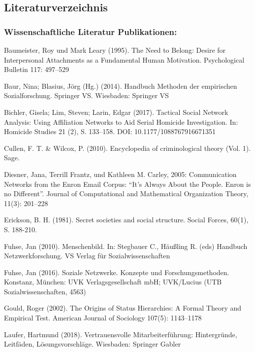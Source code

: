 \documentclass[
]{article}
\begin{document}
\hypertarget{literaturverzeichnis}{%
\subsection{Literaturverzeichnis}\label{literaturverzeichnis}}

\hypertarget{wissenschaftliche-literatur-publikationen}{%
\subsubsection{Wissenschaftliche Literatur \textbar{}
Publikationen:}\label{wissenschaftliche-literatur-publikationen}}

Baumeister, Roy und Mark Leary (1995). The Need to Belong: Desire for
Interpersonal Attachments as a Fundamental Human Motivation.
Psychological Bulletin 117: 497--529

Baur, Nina; Blasius, Jörg (Hg.) (2014). Handbuch Methoden der
empirischen Sozialforschung. Springer VS. Wiesbaden: Springer VS

Bichler, Gisela; Lim, Steven; Larin, Edgar (2017). Tactical Social
Network Analysis: Using Affiliation Networks to Aid Serial Homicide
Investigation. In: Homicide Studies 21 (2), S. 133--158. DOI:
10.1177/1088767916671351

Cullen, F. T. \& Wilcox, P. (2010). Encyclopedia of criminological
theory (Vol. 1). Sage.

Diesner, Jana, Terrill Frantz, und Kathleen M. Carley, 2005:
Communication Networks from the Enron Email Corpus: ``It's Always About
the People. Enron is no Different''. Journal of Computational and
Mathematical Organization Theory, 11(3): 201--228

Erickson, B. H. (1981). Secret societies and social structure. Social
Forces, 60(1), S. 188-210.

Fuhse, Jan (2010). Menschenbild. In: Stegbauer C., Häußling R. (eds)
Handbuch Netzwerkforschung. VS Verlag für Sozialwissenschaften

Fuhse, Jan (2016). Soziale Netzwerke. Konzepte und Forschungsmethoden.
Konstanz, München: UVK Verlagsgesellschaft mbH; UVK/Lucius (UTB
Sozialwissenschaften, 4563)

Gould, Roger (2002). The Origins of Status Hierarchies: A Formal Theory
and Empirical Test. American Journal of Sociology 107(5): 1143--1178

Laufer, Hartmund (2018). Vertrauensvolle Mitarbeiterführung:
Hintergründe, Leitfäden, Lösungsvorschläge. Wiesbaden: Springer Gabler
\end{document}
